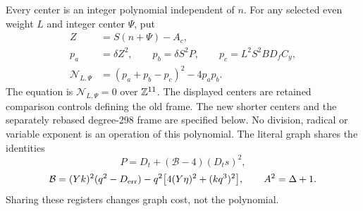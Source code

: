 Every center is an integer polynomial independent of $n$. For any selected even weight $L$ and integer center $\Psi$, put
\begin{align}
 Z&=S(n+\Psi)-A_c,\nonumber\\
 p_a&=\delta Z^2,\qquad p_b=\delta S^2P,
 \qquad p_c=L^2S^2BD_fC_y,\nonumber\\
 \mathcal N_{L,\Psi}&=(p_a+p_b-p_c)^2-4p_ap_b.
 \label{eq:scalarfinal}
\end{align}
The equation is $\mathcal N_{L,\Psi}=0$ over $\mathbb Z^{11}$.
The displayed centers are retained comparison controls defining the old
frame. The new shorter centers and the separately rebased degree-298
frame are specified below. No division,
radical or variable exponent is an operation of this polynomial. The
literal graph shares the identities
\[
 P=D_t+(\mathcal B-4)(D_ts)^2,
\]
\[
 \mathcal B=(Yk)^2(q^2-D_{\rm err})
       -q^2\bigl[4(Y\eta)^2+(kq^3)^2\bigr],
 \qquad A^2=\Delta+1.
\]
Sharing these registers changes graph cost, not the polynomial.

